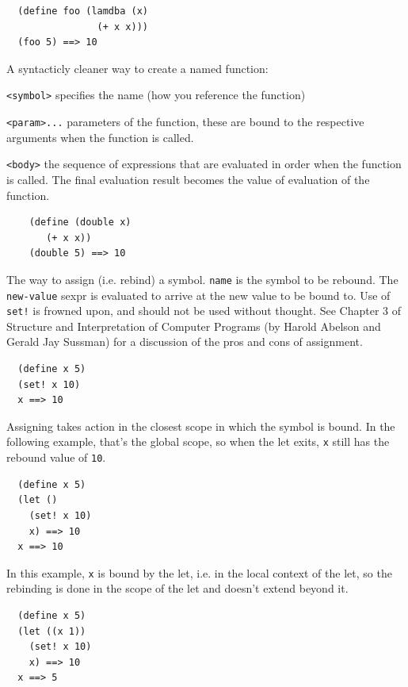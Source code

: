 \documentclass[12pt]{article}
\begin{document}
\begin{verbatim}
  (define foo (lamdba (x) 
                (+ x x)))
  (foo 5) ==> 10  
\end{verbatim}



A syntacticly cleaner way to create a named function:

\verb|<symbol>| specifies the name (how you reference the function)

\verb|<param>...| parameters of the function, these are bound to the
respective arguments when the function is called. 

\verb|<body>| the sequence of expressions that are evaluated in order
when the function is called. The final evaluation result becomes the
value of evaluation of the function. 

\begin{verbatim}
    (define (double x)
       (+ x x))
    (double 5) ==> 10
\end{verbatim}


The way to assign (i.e. rebind) a symbol. \verb|name| is the symbol to be rebound. The \verb|new-value| sexpr is
evaluated to arrive at the new value to be bound to. Use of
\verb|set!| is frowned upon, and should not be used without thought.
See Chapter 3 of Structure and Interpretation of Computer Programs (by
Harold Abelson and Gerald Jay Sussman) for a discussion of the pros
and cons of assignment.

\begin{verbatim}
  (define x 5)
  (set! x 10)
  x ==> 10
\end{verbatim}

Assigning takes action in the closest scope in which the symbol is
bound. In the following example, that's the global scope, so when the
let exits, \verb|x| still has the rebound value of \verb|10|.

\begin{verbatim}
  (define x 5)
  (let ()
    (set! x 10)
    x) ==> 10
  x ==> 10
\end{verbatim}

In this example, \verb|x| is bound by the let, i.e. in the local
context of the let, so the rebinding is done in the scope of the let
and doesn't extend beyond it.

\begin{verbatim}
  (define x 5)
  (let ((x 1))
    (set! x 10)
    x) ==> 10
  x ==> 5
\end{verbatim}
\end{document}
